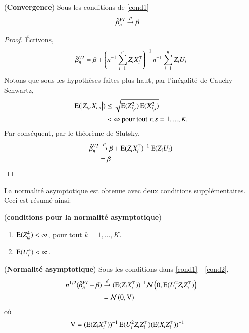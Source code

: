\documentclass[10pt, reqno]{amsart}
\begin{document}
\begin{propriete}(\textbf{Convergence})
Sous les conditions de \eqref{cond1}
\begin{align*}
	\hat{\beta}^{VI}_n  &\overset{p}{\rightarrow} \beta
\end{align*}
	\label{pr1}
\end{propriete}
\begin{proof}
\'Ecrivons,
\begin{align}
\hat{\beta}^{VI}_n = \beta + \left(n^{-1}\sum_{i=1}^n Z_iX_i^\top\right)^{-1}n^{-1}\sum_{i=1}^n Z_iU_i
\label{eq3}
\end{align}
Notons que sous les hypothèses faites plus haut, par l'inégalité de Cauchy-Schwartz,
\begin{align*}
\operatorname{E}(\left\vert {Z_{i,r}X_{i,s}} \right\vert) &\leq \sqrt{\operatorname{E}(Z_{i,r}^2)\operatorname{E}(X_{i,s}^2)}\\
&< \infty \ \textrm{pour tout} \ r, s = 1,...,K.
\end{align*}
Par conséquent, par le théorème de Slutsky,
\begin{align*}
\hat{\beta}^{VI}_n  &\overset{p}{\rightarrow} \beta + \operatorname{E}(Z_iX_i^\top)^{-1}\operatorname{E}(Z_iU_i)\\
&= \beta
\end{align*}
\end{proof}

La normalité asymptotique est obtenue avec deux conditions supplémentaires. Ceci est résumé ainsi:
\begin{condition}(\textbf{conditions pour la normalité asymptotique})
\begin{enumerate}[label = (C2.\arabic*)]
\item $\operatorname{E}(Z_{ik}^4) < \infty$, pour tout $k=1,...,K$. 
\item $\operatorname{E}(U_i^4)<\infty$.
\end{enumerate}
\label{cond2}
\end{condition}

\begin{propriete}(\textbf{Normalité asymptotique})
Sous les conditions dans \eqref{cond1} - \eqref{cond2},
\begin{align*}
	n^{1/2}(\hat{\beta}^{VI}_n - \beta ) &\overset{d}{\rightarrow} (\operatorname{E}(Z_iX_i^\top))^{-1}\mathcal{N}\left(0,\operatorname{E}(U_i^2Z_iZ_i^\top)\right)\\
&=\mathcal{N}\left(0,  \operatorname{V}\right)
\end{align*}
où 
\begin{align*}
\operatorname{V} &= (\operatorname{E}(Z_iX_i^\top))^{-1}\operatorname{E}(U_i^2Z_iZ_i^\top) (\operatorname{E}(X_iZ_i^\top))^{-1}
\end{align*}
	\label{pr2}
\end{propriete}
\end{document}
